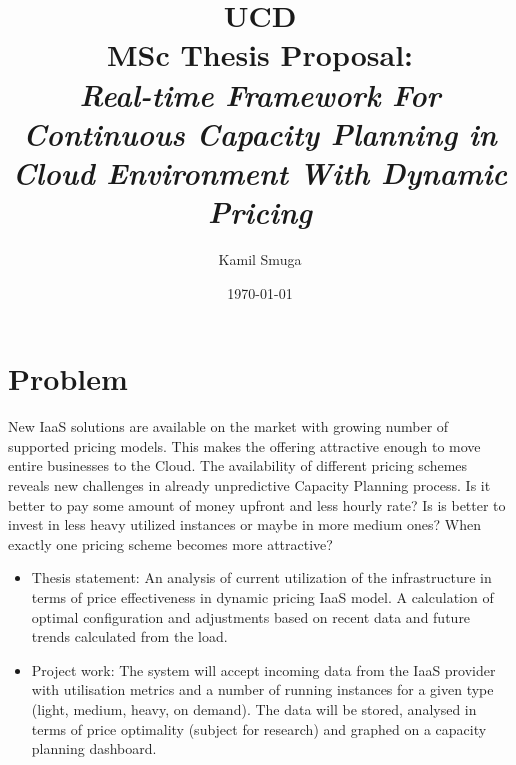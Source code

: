 \documentclass[11pt]{artikel3}
\title{UCD\\MSc Thesis Proposal:\\\emph{Real-time Framework For Continuous Capacity Planning in Cloud Environment With Dynamic Pricing}}
\author{Kamil Smuga}
\date{\today}
\begin{document}
\maketitle








\section{Problem}




New IaaS solutions are available on the market with growing number of supported pricing models. This makes the offering attractive enough to move entire businesses to the Cloud. The availability of different pricing schemes reveals new challenges in already unpredictive Capacity Planning process. Is it better to pay some amount of money upfront and less hourly rate? Is is better to invest in less heavy utilized instances or maybe in more medium ones? When exactly one pricing scheme becomes more attractive?




\begin{itemize}
  \item Thesis statement: An analysis of current utilization of the infrastructure in terms of price effectiveness in dynamic pricing IaaS model. A calculation of optimal configuration and adjustments based on recent data and future trends calculated from the load. 
  \item Project work: The system will accept incoming data from the IaaS provider with utilisation metrics and a number of running instances for a given type (light, medium, heavy, on demand). The data will be stored, analysed in terms of price optimality (subject for research) and graphed on a capacity planning dashboard.  
\end{itemize}
\end{document}
